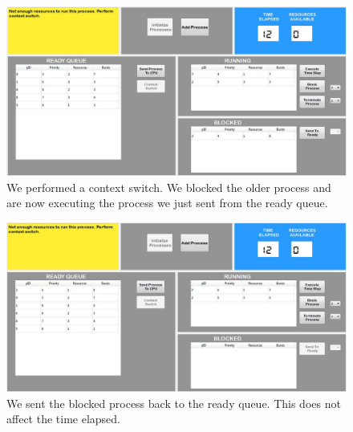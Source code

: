 \documentclass{article}
\begin{document}
\begin{figure}[H]
 \centering
 \includegraphics[height = 9 cm]{ss9.JPG}
 \caption{We performed a context switch. We blocked the older process and are now executing the process we just sent from the ready queue.}
\end{figure}

\begin{figure}[H]
 \centering
 \includegraphics[height = 9 cm]{ss10.JPG}
 \caption{We sent the blocked process back to the ready queue. This does not affect the time elapsed.}
\end{figure}





\end{document}
